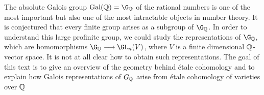 The absolute Galois group $\Gal(\Q) = \G_\Q$ of the rational numbers is one of the most important but also one of the most intractable objects in number theory. It is conjectured that every finite group arises as a subgroup of $\G_\Q$. In order to understand this large profinite group, we could study the representations of $\G_\Q$, which are homomorphisms $\G_\Q \to \GL_n(V)$, where $V$ is a finite dimensional $\mathbb{Q}$-vector space. It is not at all clear how to obtain such representations. The goal of this text is to give an overview of the geometry behind \'etale cohomology and to explain how Galois representations of $G_{\mathbb{Q}}$ arise from \'etale cohomology of varieties over $\mathbb{Q}$
